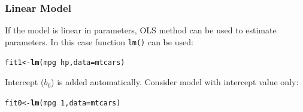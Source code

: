 \documentclass[12pt]{beamer}\usepackage[]{graphicx}\usepackage[]{color}
\makeatletter
\newcommand{\hlnum}[1]{\textcolor[rgb]{0.686,0.059,0.569}{#1}}%
\newcommand{\hlopt}[1]{\textcolor[rgb]{0,0,0}{#1}}%
\newcommand{\hlstd}[1]{\textcolor[rgb]{0.345,0.345,0.345}{#1}}%
\newcommand{\hlkwb}[1]{\textcolor[rgb]{0.69,0.353,0.396}{#1}}%
\newcommand{\hlkwc}[1]{\textcolor[rgb]{0.333,0.667,0.333}{#1}}%
\newcommand{\hlkwd}[1]{\textcolor[rgb]{0.737,0.353,0.396}{\textbf{#1}}}%
\newenvironment{kframe}{%
 \def\at@end@of@kframe{}%
 \ifinner\ifhmode%
  \def\at@end@of@kframe{\end{minipage}}%
  \begin{minipage}{\columnwidth}%
 \fi\fi%
 \def\FrameCommand##1{\hskip\@totalleftmargin \hskip-\fboxsep
 \colorbox{shadecolor}{##1}\hskip-\fboxsep
     \hskip-\linewidth \hskip-\@totalleftmargin \hskip\columnwidth}%
 \MakeFramed {\advance\hsize-\width
   \@totalleftmargin\z@ \linewidth\hsize
   \@setminipage}}%
 {\par\unskip\endMakeFramed%
 \at@end@of@kframe}
\newenvironment{knitrout}{}{} %
\makeatother
\begin{document}

\begin{frame}[fragile]\large
\frametitle{Linear Model}


If the model is linear in parameters, OLS method can be used to estimate parameters. In this case function \texttt{lm()} can be used:

\begin{knitrout}
\color{fgcolor}\begin{kframe}
\begin{alltt}
\hlstd{fit1} \hlkwb{<-} \hlkwd{lm}\hlstd{(mpg} \hlopt{~} \hlstd{hp,} \hlkwc{data}\hlstd{=mtcars)}
\end{alltt}
\end{kframe}
\end{knitrout}
Intercept ($b_0$) is added automatically.  Consider model with intercept value only:

\begin{knitrout}
\color{fgcolor}\begin{kframe}
\begin{alltt}
\hlstd{fit0} \hlkwb{<-} \hlkwd{lm}\hlstd{(mpg} \hlopt{~} \hlnum{1}\hlstd{,} \hlkwc{data}\hlstd{=mtcars)}
\end{alltt}
\end{kframe}
\end{knitrout}

\end{frame}

\end{document}
